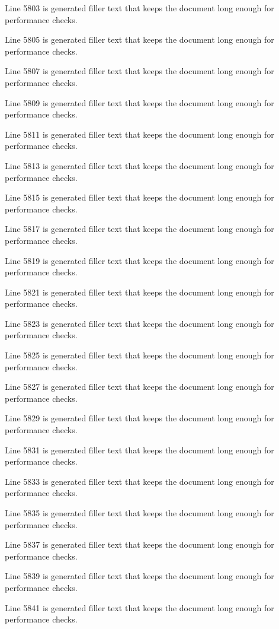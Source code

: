 Line 5803 is generated filler text that keeps the document long enough for performance checks.

Line 5805 is generated filler text that keeps the document long enough for performance checks.

Line 5807 is generated filler text that keeps the document long enough for performance checks.

Line 5809 is generated filler text that keeps the document long enough for performance checks.

Line 5811 is generated filler text that keeps the document long enough for performance checks.

Line 5813 is generated filler text that keeps the document long enough for performance checks.

Line 5815 is generated filler text that keeps the document long enough for performance checks.

Line 5817 is generated filler text that keeps the document long enough for performance checks.

Line 5819 is generated filler text that keeps the document long enough for performance checks.

Line 5821 is generated filler text that keeps the document long enough for performance checks.

Line 5823 is generated filler text that keeps the document long enough for performance checks.

Line 5825 is generated filler text that keeps the document long enough for performance checks.

Line 5827 is generated filler text that keeps the document long enough for performance checks.

Line 5829 is generated filler text that keeps the document long enough for performance checks.

Line 5831 is generated filler text that keeps the document long enough for performance checks.

Line 5833 is generated filler text that keeps the document long enough for performance checks.

Line 5835 is generated filler text that keeps the document long enough for performance checks.

Line 5837 is generated filler text that keeps the document long enough for performance checks.

Line 5839 is generated filler text that keeps the document long enough for performance checks.

Line 5841 is generated filler text that keeps the document long enough for performance checks.

